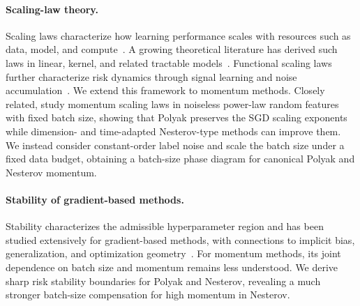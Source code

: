 \documentclass[11pt]{article}
\begin{document}
\paragraph{Scaling-law theory.}
Scaling laws characterize how learning performance scales with resources such as data, model, and compute~\citep{hestness2017deep,kaplan2020scaling,hoffmann2022training,grattafiori2024llama,deepseekai2026deepseekv4}. A growing theoretical literature has derived such laws in linear, kernel, and related tractable models~\citep{sharma2022scaling,hutter2021learning,maloney2022solvable,wei2022more,jain2024scaling,michaud2023quantization,nam2024exactly,atanasov2026scaling,bahri2024explaining,dohmatob2024tale,bordelon2024dynamical,lin2024scaling,paquette2024phases,bordelon2025feature,yan2026larger,lin2025improved,sous2026asymmetric,li2026functional,zhang2025critical,wang2026fast,li2026optimal,ding2025scalinglawstochasticgradient}. Functional scaling laws further characterize risk dynamics through signal learning and noise accumulation~\citep{li2026functional}. We extend this framework to momentum methods. Closely related, \citet{ferbach2026dimension} study momentum scaling laws in noiseless power-law random features with fixed batch size, showing that Polyak preserves the SGD scaling exponents while dimension- and time-adapted Nesterov-type methods can improve them. We instead consider constant-order label noise and scale the batch size under a fixed data budget, obtaining a batch-size phase diagram for canonical Polyak and Nesterov momentum.

\vspace{-.5em}
\paragraph{Stability of gradient-based methods.}
Stability characterizes the admissible hyperparameter region and has been studied extensively for gradient-based methods, with connections to implicit bias, generalization, and optimization geometry~\citep{zhu2019anisotropic,wu2018sgd,nar2018step,ma2021linear,wu2022alignment,wu2023implicit,chemnitz2025characterizing,mulayoff2021implicit,nacson2023implicit,qiao2024stable,kaur2023maximum,wang2023theoretical}. For momentum methods, its joint dependence on batch size and momentum remains less understood. We derive sharp risk stability boundaries for Polyak and Nesterov, revealing a much stronger batch-size compensation for high momentum in Nesterov.

\vspace{-.5em}
\end{document}
